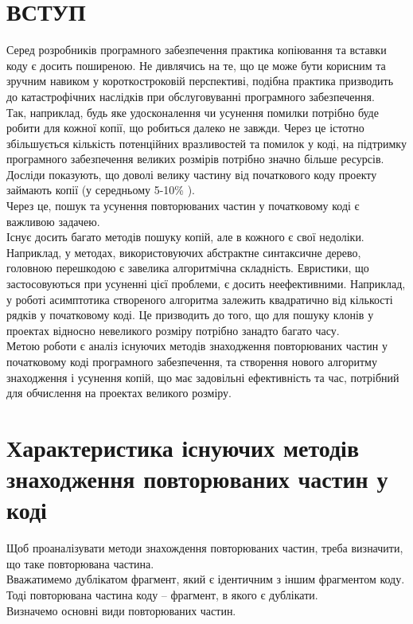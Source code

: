 \documentclass[a4paper, 14pt]{article}
\begin{document}
\section*{\textbf{ВСТУП}}
Серед розробників програмного забезпечення практика копіювання та вставки коду є досить поширеною. Не дивлячись на те, що це може бути корисним та зручним навиком у короткостроковій перспективі, подібна практика призводить до катастрофічних наслідків при обслуговуванні програмного забезпечення. \\ Так, наприклад, будь яке удосконалення чи усунення помилки потрібно буде робити для кожної копії, що робиться далеко не завжди. Через це істотно збільшується кількість потенційних вразливостей та помилок у коді, на підтримку програмного забезпечення великих розмірів потрібно значно більше ресурсів. \\
Досліди показують, що доволі велику частину від початкового коду проекту займають копії (у середньому 5-10\% \cite{Baxter98}). \\
Через це, пошук та усунення повторюваних частин у початковому коді є важливою задачею. \\
Існує досить багато методів пошуку копій, але в кожного є свої недоліки. Наприклад, у методах, використовуючих абстрактне синтаксичне дерево, головною перешкодою є завелика алгоритмічна складність. Евристики, що застосовуються при усуненні цієї проблеми, є досить неефективними. Наприклад, у роботі \cite{Baxter98} асимптотика створеного алгоритма залежить квадратично від кількості рядків у початковому коді. Це призводить до того, що для пошуку клонів у проектах відносно невеликого розміру потрібно занадто багато часу. \cite{Sager06} \\
Метою роботи є аналіз існуючих методів знаходження повторюваних частин у початковому коді програмного забезпечення, та створення нового алгоритму знаходження і усунення копій, що має задовільні ефективність та час, потрібний для обчислення на проектах великого розміру.
\newpage
\section{Характеристика існуючих методів знаходження повторюваних частин у коді}
\label{sec:characteristics}
Щоб проаналізувати методи знахождення повторюваних частин, треба визначити, що таке повторювана частина. \\
Вважатимемо дублікатом фрагмент, який є ідентичним з іншим фрагментом коду. \\
Тоді повторювана частина коду -- фрагмент, в якого є дублікати. \\
Визначемо основні види повторюваних частин.
\end{document}
